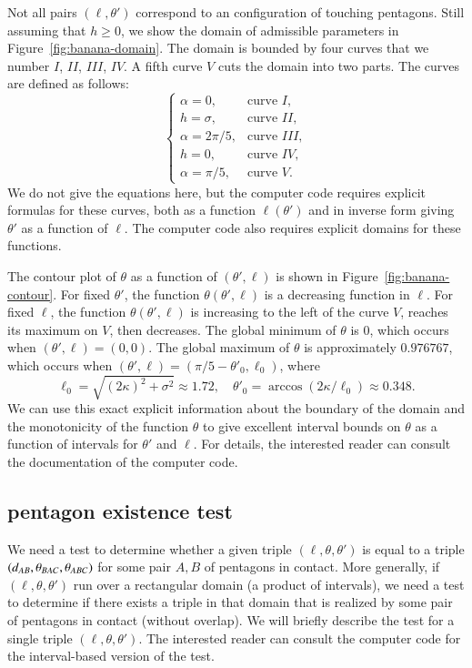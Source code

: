 Not all pairs $(\ell,\theta')$ correspond to an configuration of
touching pentagons.  Still assuming that $h\ge0$, we show the domain
of admissible parameters in Figure~\ref{fig:banana-domain}.  The
domain is bounded by four curves that we number $I$, $II$, $III$,
$IV$.  A fifth curve $V$ cuts the domain into two parts.  The curves
are defined as follows:
\[
\begin{cases}
\alpha = 0, &\text{curve } I,\\
h = \sigma, &\text{curve } II,\\
\alpha = 2\pi/5, &\text{curve } III,\\
h = 0, & \text{curve } IV,\\
\alpha = \pi/5, & \text{curve } V.
\end{cases}
\]
We do not give the equations here, but the computer code requires
explicit formulas for these curves, both as a function $\ell(\theta')$
and in inverse form giving $\theta'$ as a function of $\ell$.  The
computer code also requires explicit domains for these functions.


The contour plot of $\theta$ as a function of $(\theta',\ell)$ is
shown in Figure~\ref{fig:banana-contour}.  For fixed $\theta'$, the
function $\theta(\theta',\ell)$ is a decreasing function in $\ell$.
For fixed $\ell$, the function $\theta(\theta',\ell)$ is increasing to
the left of the curve $V$, reaches its maximum on $V$, then decreases.
The global minimum of $\theta$ is $0$, which occurs when
$(\theta',\ell)=(0,0)$.  The global maximum of $\theta$ is
approximately $0.976767$, which occurs when $(\theta',\ell) = (\pi/5 -
\theta'_0,\ell_0)$, where
\[
\ell_0 = \sqrt{(2\kappa)^2 + \sigma^2}\approx 1.72,\quad
\theta'_0 = \arccos (2\kappa/\ell_0) \approx 0.348.
\]
We can use this exact explicit information about the boundary of the
domain and the monotonicity of the function $\theta$ to give excellent
interval bounds on $\theta$ as a function of intervals for $\theta'$
and $\ell$.  For details, the interested reader can consult the
documentation of the computer code.


\subsection{pentagon existence test}

We need a test to determine whether a given triple
$(\ell,\theta,\theta')$ is equal to a triple
$(d_{AB},\theta_{BAC},\theta_{ABC})$ for some pair $A,B$ of pentagons
in contact.  More generally, if $(\ell,\theta,\theta')$ run over a
rectangular domain (a product of intervals), we need a test to
determine if there exists a triple in that domain that is realized by
some pair of pentagons in contact (without overlap).  We will briefly
describe the test for a single triple $(\ell,\theta,\theta')$.  The
interested reader can consult the computer code for the interval-based
version of the test.

